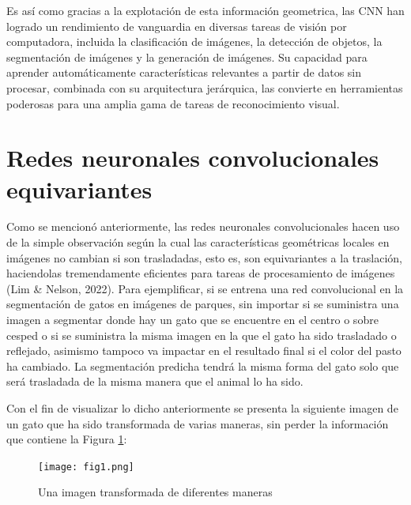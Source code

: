 \documentclass[12pt,letterpaper,final, openany]{scrbook}
\begin{document}
Es así como gracias a la explotación de esta información geometrica, las CNN han logrado un rendimiento de vanguardia en diversas tareas de visión por computadora, incluida la clasificación de imágenes, la detección de objetos, la segmentación de imágenes y la generación de imágenes. Su capacidad para aprender automáticamente características relevantes a partir de datos sin procesar, combinada con su arquitectura jerárquica, las convierte en herramientas poderosas para una amplia gama de tareas de reconocimiento visual.




\section{Redes neuronales convolucionales equivariantes}

Como se mencionó anteriormente, las redes neuronales convolucionales hacen uso de la simple observación según la cual las características geométricas locales en imágenes no cambian si son trasladadas, esto es, son equivariantes a la traslación, haciendolas tremendamente eficientes para tareas de procesamiento de imágenes (Lim \& Nelson, 2022). Para ejemplificar, si se entrena una red convolucional en la segmentación de gatos en imágenes de parques, sin importar si se suministra una imagen a segmentar donde hay un gato que se encuentre en el centro o sobre cesped o si se suministra la misma imagen en la que el gato ha sido trasladado o reflejado, asimismo tampoco va impactar en el resultado final si el color del pasto ha cambiado. La segmentación predicha tendrá la misma forma del gato solo que será trasladada de la misma manera que el animal lo ha sido.

Con el fin de visualizar lo dicho anteriormente se presenta la siguiente imagen de un gato que ha sido transformada de varias maneras, sin perder la información que contiene la Figura \ref{fig:cat}:
\begin{figure}[h!]
\texttt{[image: fig1.png]}
\caption{Una imagen transformada de diferentes maneras}
\label{fig:cat}
\end{figure}
\end{document}
